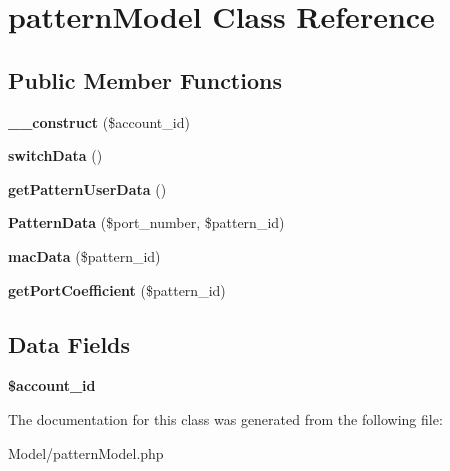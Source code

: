 \hypertarget{classpattern_model}{\section{pattern\-Model Class Reference}
\label{classpattern_model}
}
\subsection*{Public Member Functions}
\begin{DoxyCompactItemize}
\item 
\hypertarget{classpattern_model_ae207f7fe29d94a4271fb32a156b4ce64}{{\bfseries \-\_\-\-\_\-construct} (\$account\-\_\-id)}\label{classpattern_model_ae207f7fe29d94a4271fb32a156b4ce64}

\item 
\hypertarget{classpattern_model_a4f92dd070690a6c938d15a9363065351}{{\bfseries switch\-Data} ()}\label{classpattern_model_a4f92dd070690a6c938d15a9363065351}

\item 
\hypertarget{classpattern_model_a12a4b27a766b5c4573d24e255d1ef5a4}{{\bfseries get\-Pattern\-User\-Data} ()}\label{classpattern_model_a12a4b27a766b5c4573d24e255d1ef5a4}

\item 
\hypertarget{classpattern_model_a5c106765af75e3a68d2191cdc2d784f3}{{\bfseries Pattern\-Data} (\$port\-\_\-number, \$pattern\-\_\-id)}\label{classpattern_model_a5c106765af75e3a68d2191cdc2d784f3}

\item 
\hypertarget{classpattern_model_a31f25239e28e31eb5baa5ab4564675b8}{{\bfseries mac\-Data} (\$pattern\-\_\-id)}\label{classpattern_model_a31f25239e28e31eb5baa5ab4564675b8}

\item 
\hypertarget{classpattern_model_a0f19e4f669687aaa80334bd503890fa7}{{\bfseries get\-Port\-Coefficient} (\$pattern\-\_\-id)}\label{classpattern_model_a0f19e4f669687aaa80334bd503890fa7}

\end{DoxyCompactItemize}
\subsection*{Data Fields}
\begin{DoxyCompactItemize}
\item 
\hypertarget{classpattern_model_a7c3eb7a98818df12bc88e63ac7ea9c63}{{\bfseries \$account\-\_\-id}}\label{classpattern_model_a7c3eb7a98818df12bc88e63ac7ea9c63}

\end{DoxyCompactItemize}


The documentation for this class was generated from the following file\-:\begin{DoxyCompactItemize}
\item 
Model/pattern\-Model.\-php\end{DoxyCompactItemize}
